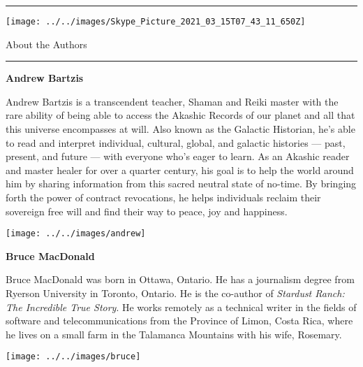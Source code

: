 \documentclass[letterpaper,11pt,twoside,onecolumn,openany]{book}
\begin{document}
	\thispagestyle{empty}
	
	\hrule
	
	\vspace{35mm}
	
	\begin{center}
		\texttt{[image: ../../images/Skype\_Picture\_2021\_03\_15T07\_43\_11\_650Z]}
	\end{center}
	
	\newpage
	
	\thispagestyle{empty}
	
	\begin{center}
		
		\huge{About the Authors}
		
		
		
	\end{center}
	
	\hrule
	
	\vspace{5mm}
	
	\noindent\textbf{{\large Andrew Bartzis}}
	
	\vspace{5mm}
	
	\singlespace
	\small{
		\noindent Andrew Bartzis is a transcendent teacher, Shaman and Reiki master with the rare ability of being able to access the Akashic Records of our planet and all that this universe encompasses at will. Also known as the Galactic Historian, he's able to read and interpret individual, cultural, global, and galactic histories --- past, present, and future --- with everyone who's eager to learn. As an Akashic reader and master healer for over a quarter century, his goal is to help the world around him by sharing information from this sacred neutral state of no-­time. By bringing forth the power of contract revocations, he helps individuals reclaim their sovereign free will and find their way to peace, joy and happiness.}
	\begin{center}
		\texttt{[image: ../../images/andrew]}
	\end{center}
	
	
	
	\vspace{5mm}
	
	\noindent\textbf{{\large Bruce MacDonald}}
	
	\vspace{5mm}
	
	\singlespace
	\small{
		\noindent
		Bruce MacDonald was born in Ottawa, Ontario. He has a journalism degree from Ryerson University in Toronto, Ontario. He is the co-author of \textit{Stardust Ranch: The Incredible True Story}. He works remotely as a technical writer in the fields of software and telecommunications from the Province of Limon, Costa Rica, where he lives on a small farm in the Talamanca Mountains with his wife, Rosemary.}
	
	
	
	
	\begin{center}
		\texttt{[image: ../../images/bruce]}
	\end{center}
	
	
	
\end{document}

